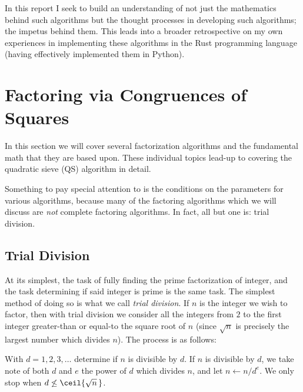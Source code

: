 \documentclass{report}
\begin{document}
In this report I seek to build an understanding of not just the mathematics behind such algorithms
but the thought processes in developing such algorithms; the impetus behind them. This leads into
a broader retrospective on my own experiences in implementing these algorithms in the Rust
programming language (having effectively implemented them in Python).

\pagebreak

\chapter{Factoring via Congruences of Squares}

In this section we will cover several factorization algorithms and the fundamental math that they
are based upon. These individual topics lead-up to covering the quadratic sieve (QS) algorithm
in detail.

Something to pay special attention to is the conditions on the parameters for various algorithms,
because many of the factoring algorithms which we will discuss are \emph{not} complete factoring
algorithms. In fact, all but one is: trial division.

\section{Trial Division}
At its simplest, the task of fully finding the prime factorization of integer, and the task
determining if said integer is prime is the same task. The simplest method of doing so is what we
call \emph{trial division}.
If $n$ is the integer we wish to factor, then with trial division we consider all the integers from
$2$ to the first integer greater-than or equal-to the square root of $n$ (since $\sqrt n$ is
precisely the largest number which divides $n$). The process is as follows:

With $d=1,2,3,\ldots$ determine if $n$ is divisible by $d$. If $n$ is divisible by $d$, we take note
of both $d$ and $e$ the power of $d$ which divides $n$, and let $n \gets n/d^e$. We only stop when
$d\not\le\ceil{\sqrt n\,}$.
\end{document}
